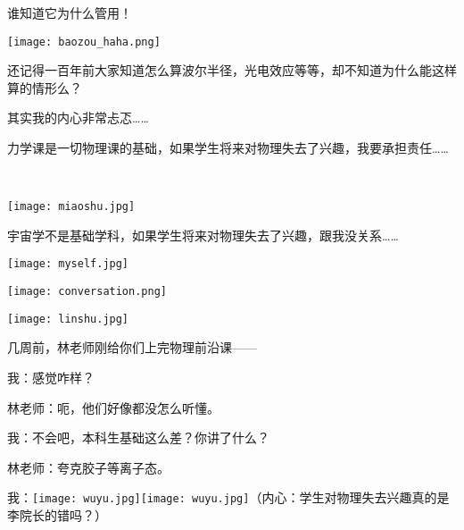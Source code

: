 \documentclass[CJK]{beamer}
\begin{document}
\begin{frame}
\bch
\begin{minipage}{0.6\textwidth}
谁知道它为什么管用！
\end{minipage}
\begin{minipage}{0.3\textwidth}
\texttt{[image: baozou\_haha.png]}
\end{minipage}

\skipline
\skipline
\skipline
\skipline
还记得一百年前大家知道怎么算波尔半径，光电效应等等，却不知道为什么能这样算的情形么？
\ech
\end{frame}


\begin{frame}
\bch
其实我的内心非常忐忑……
\ech
\end{frame}


\begin{frame}
\bch
\skipline
\begin{minipage}{0.4\textwidth}
力学课是一切物理课的基础，如果学生将来对物理失去了兴趣，我要承担责任……

\vskip 2in
\ 
\end{minipage}
\texttt{[image: miaoshu.jpg]}
\ech
\end{frame}


\begin{frame}
\bch
\skipline
\begin{minipage}{0.4\textwidth}
宇宙学不是基础学科，如果学生将来对物理失去了兴趣，跟我没关系……
\vskip 2in
\ 
\end{minipage}
\texttt{[image: myself.jpg]}
\ech
\end{frame}


\begin{frame}
\bch
\texttt{[image: conversation.png]}
\ech
\end{frame}


\begin{frame}
\bch
\begin{minipage}{0.4\textwidth}
\texttt{[image: linshu.jpg]}
\end{minipage}
\begin{minipage}{0.55\textwidth}
\begin{scriptsize}
几周前，林老师刚给你们上完物理前沿课——
\skipline

我：感觉咋样？
\skipline

林老师：呃，他们好像都没怎么听懂。
\skipline

我：不会吧，本科生基础这么差？你讲了什么？
\skipline

林老师：夸克胶子等离子态。
\skipline

我：\texttt{[image: wuyu.jpg]}\texttt{[image: wuyu.jpg]}（内心：学生对物理失去兴趣真的是李院长的错吗？）


\end{scriptsize}
\end{minipage}
\ech
\end{frame}
\end{document}
